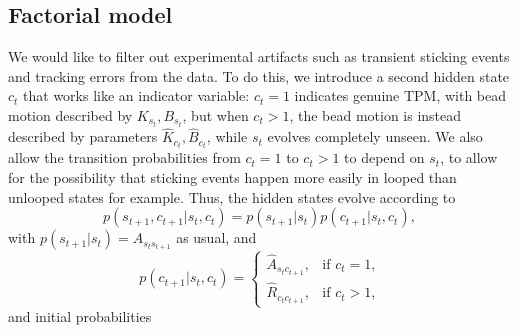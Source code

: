 \subsection{Factorial model}
We would like to filter out experimental artifacts such as transient
sticking events and tracking errors from the data. To do this, we
introduce a second hidden state $c_t$ that works like an indicator
variable: $c_t=1$ indicates genuine TPM, with bead motion described by
$K_{s_t},B_{s_t}$, but when $c_t>1$, the bead motion is instead
described by parameters $\hat K_{c_t},\hat B_{c_t}$, while $s_t$
evolves completely unseen.  We also allow the transition probabilities
from $c_t=1$ to $c_t>1$ to depend on $s_t$, to allow for the
possibility that sticking events happen more easily in looped than
unlooped states for example. Thus, the hidden states evolve according
to
\begin{equation}
  p(s_{t+1},c_{t+1}|s_t,c_t)=p(s_{t+1}|s_t)p(c_{t+1}|s_t,c_t),
\end{equation}
with $p(s_{t+1}|s_t)=A_{s_ts_{t+1}}$ as usual, and 
\begin{equation}
  p(c_{t+1}|s_t,c_t)=\left\{
  \begin{array}{ll}
    \hat A_{s_tc_{t+1}},&\text{if $c_t=1$,}\\
    \hat R_{c_tc_{t+1}},&\text{if $c_t>1$,}    
  \end{array}\right.
\end{equation}
and initial probabilities 




\cite{vbTPM_model:describefactorialmodel}
